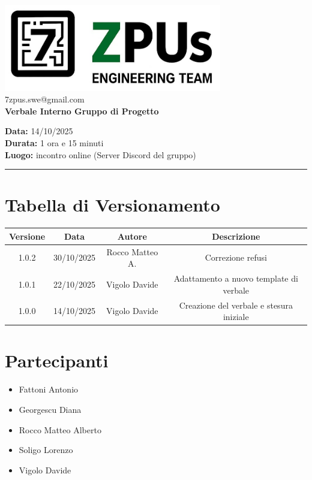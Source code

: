 \documentclass[a4paper,12pt]{article}
\begin{document}
\begin{center}
    \includegraphics[width=9.5cm]{../../../assets/logo7zpus.jpg}\\
    \small\hspace{10cm} 7zpus.swe@gmail.com\\
    \Large \textbf{Verbale Interno Gruppo di Progetto}\\
    \vspace{0.5cm}
\end{center}

\noindent
\textbf{Data:} 14/10/2025 \\
\textbf{Durata:} 1 ora e 15 minuti \\
\textbf{Luogo:} incontro online (Server Discord del gruppo)

\vspace{0.3cm}
\hrule
\vspace{0.5cm}

\tableofcontents

\newpage

\section*{Tabella di Versionamento}
    \begin{tabular}{|c|c|c|c|}
        \hline
        \textbf{Versione} & \textbf{Data} & \textbf{Autore} & \textbf{Descrizione} \\
        \hline
        1.0.2 & 30/10/2025 & Rocco Matteo A. & Correzione refusi \\
        \hline
        1.0.1 & 22/10/2025 & Vigolo Davide & Adattamento a nuovo template di verbale \\
        \hline
        1.0.0 & 14/10/2025 & Vigolo Davide & Creazione del verbale e stesura iniziale \\
        \hline
    \end{tabular}


\section*{Partecipanti}
\begin{itemize}[noitemsep]
    \item Fattoni Antonio
    \item Georgescu Diana
    \item Rocco Matteo Alberto
    \item Soligo Lorenzo
    \item Vigolo Davide
\end{itemize}
\end{document}
